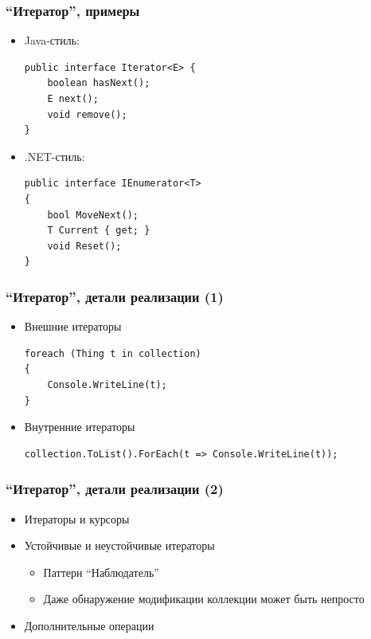 \documentclass[xetex,mathserif,serif]{beamer}
\begin{document}
    \begin{frame}[fragile]
        \frametitle{``Итератор'', примеры}
        \begin{itemize}
            \item Java-стиль:
            \begin{verbatim}
public interface Iterator<E> {
    boolean hasNext();
    E next();
    void remove();
}
            \end{verbatim}
            \item .NET-стиль:
            \begin{verbatim}
public interface IEnumerator<T>
{
    bool MoveNext();
    T Current { get; }
    void Reset();
}
            \end{verbatim}
        \end{itemize}
    \end{frame}

    \begin{frame}[fragile]
        \frametitle{``Итератор'', детали реализации (1)}
        \begin{itemize}
            \item Внешние итераторы
            \begin{verbatim}
foreach (Thing t in collection)
{
    Console.WriteLine(t);
} 
            \end{verbatim}
            \item Внутренние итераторы
            \begin{verbatim}
collection.ToList().ForEach(t => Console.WriteLine(t));
            \end{verbatim}
        \end{itemize}
    \end{frame}

    \begin{frame}
        \frametitle{``Итератор'', детали реализации (2)}
        \begin{itemize}
            \item Итераторы и курсоры
            \item Устойчивые и неустойчивые итераторы
            \begin{itemize}
                \item Паттерн ``Наблюдатель''
                \item Даже обнаружение модификации коллекции может быть непросто
            \end{itemize}
            \item Дополнительные операции
        \end{itemize}
    \end{frame}
\end{document}
